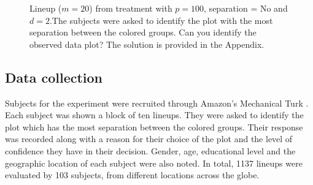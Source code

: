  
\begin{figure}[hbtp]
       \caption{Lineup  ($m=20$) from treatment with $p = 100$, separation = No and $d = 2$.The subjects were asked to identify the plot with the most separation between the colored groups. Can you identify the observed data plot? The solution is provided in the Appendix. }
       \label{fig:test_category}
\end{figure}


\subsection{Data collection}

Subjects  for the experiment were recruited through Amazon's Mechanical Turk  \citep{turk}. 
Each subject was shown a block of ten lineups. They were asked to identify the plot which has the most separation between the colored groups. Their response was recorded along with a reason for their choice of the plot and the level of confidence they have in their decision.  Gender, age, educational level and the geographic location of each subject were also noted. In total, 1137 lineups were evaluated by 103 subjects, from different locations across the globe. 

